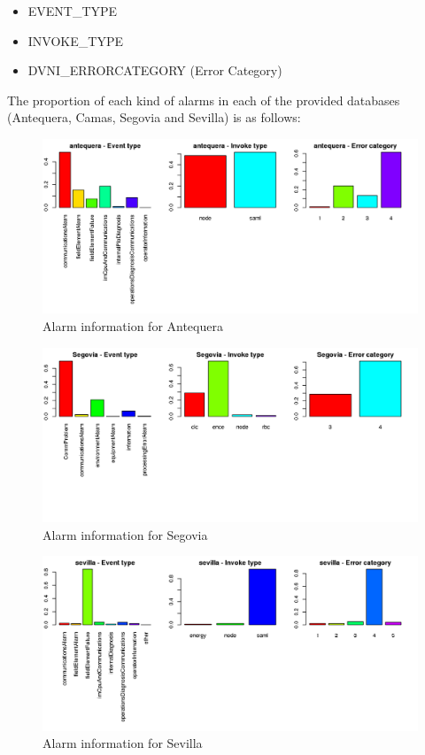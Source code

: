 \documentclass[a4paper,10pt]{report}
\begin{document}
\begin{itemize}
 \item EVENT\_TYPE
 \item INVOKE\_TYPE
 \item DVNI\_ERRORCATEGORY (Error Category)
\end{itemize}

The proportion of each kind of alarms in each of the provided databases (Antequera, Camas, Segovia and Sevilla) is as follows:
\begin{figure}[ht!]
 \centering
 \includegraphics[width=\textwidth]{./img/antequera_graph.png}
 \caption{Alarm information for Antequera}
 \label{fig:anteq}
\end{figure}
\begin{figure}[ht!]
 \centering
 \includegraphics[width=\textwidth]{./img/segovia_graph.png}
 \caption{Alarm information for Segovia}
 \label{fig:segovia}
\end{figure}
\begin{figure}[ht!]
 \centering
 \includegraphics[width=\textwidth]{./img/sevilla_graph.png}
 \caption{Alarm information for Sevilla}
 \label{fig:sevilla}
\end{figure}
\end{document}
